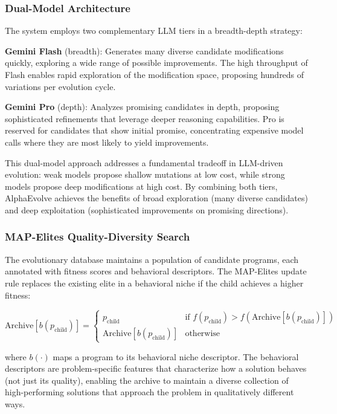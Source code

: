 \subsubsection{Dual-Model Architecture}

The system employs two complementary LLM tiers in a breadth-depth strategy:

\textbf{Gemini Flash} (breadth): Generates many diverse candidate modifications quickly, exploring a wide range of possible improvements. The high throughput of Flash enables rapid exploration of the modification space, proposing hundreds of variations per evolution cycle.

\textbf{Gemini Pro} (depth): Analyzes promising candidates in depth, proposing sophisticated refinements that leverage deeper reasoning capabilities. Pro is reserved for candidates that show initial promise, concentrating expensive model calls where they are most likely to yield improvements.

This dual-model approach addresses a fundamental tradeoff in LLM-driven evolution: weak models propose shallow mutations at low cost, while strong models propose deep modifications at high cost. By combining both tiers, AlphaEvolve achieves the benefits of broad exploration (many diverse candidates) and deep exploitation (sophisticated improvements on promising directions).

\subsubsection{MAP-Elites Quality-Diversity Search}

The evolutionary database maintains a population of candidate programs, each annotated with fitness scores and behavioral descriptors. The MAP-Elites update rule replaces the existing elite in a behavioral niche if the child achieves a higher fitness:

\begin{equation}
\text{Archive}[b(p_{\text{child}})] = \begin{cases} p_{\text{child}} & \text{if } f(p_{\text{child}}) > f(\text{Archive}[b(p_{\text{child}})]) \\ \text{Archive}[b(p_{\text{child}})] & \text{otherwise} \end{cases}
\end{equation}

where $b(\cdot)$ maps a program to its behavioral niche descriptor. The behavioral descriptors are problem-specific features that characterize how a solution behaves (not just its quality), enabling the archive to maintain a diverse collection of high-performing solutions that approach the problem in qualitatively different ways.

